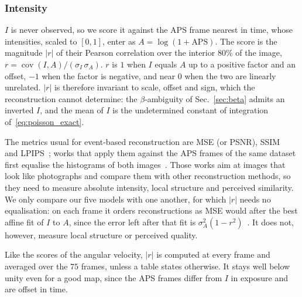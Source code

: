 \documentclass[journal]{IEEEtran}
\newcommand{\Imap}{I}
\begin{document}
\subsubsection{Intensity}
\label{sec:recon_metric}
$\Imap$ is never observed, so we score it against the APS frame nearest in time, whose intensities, scaled to $[0,1]$, enter as $A = \log(1+\text{APS})$. The score is the magnitude $|r|$ of their Pearson correlation over the interior $80\%$ of the image, $r = \operatorname{cov}(\Imap, A)/(\sigma_{\Imap}\,\sigma_A)$. $r$ is $1$ when $\Imap$ equals $A$ up to a positive factor and an offset, $-1$ when the factor is negative, and near $0$ when the two are linearly unrelated. $|r|$ is therefore invariant to scale, offset and sign, which the reconstruction cannot determine: the $\beta$-ambiguity of Sec.~\ref{sec:beta} admits an inverted $\Imap$, and the mean of $\Imap$ is the undetermined constant of integration of~\eqref{eq:poisson_exact}.

 
The metrics usual for event-based reconstruction are MSE (or PSNR), SSIM~\cite{wang2004ssim} and LPIPS~\cite{zhang2018lpips}; works that apply them against the APS frames of the same dataset first equalise the histograms of both images~\cite{rebecq2019e2vid,zhang2023formulating}. Those works aim at images that look like photographs and compare them with other reconstruction methods, so they need to measure absolute intensity, local structure and perceived similarity. We only compare our five models with one another, for which $|r|$ needs no equalisation: on each frame it orders reconstructions as MSE would after the best affine fit of $\Imap$ to $A$, since the error left after that fit is $\sigma_A^2(1-r^2)$~\cite{freedman2007statistics}. It does not, however, measure local structure or perceived quality.


Like the scores of the angular velocity, $|r|$ is computed at every frame and averaged over the $75$ frames, unless a table states otherwise. It stays well below unity even for a good map, since the APS frames differ from $\Imap$ in exposure and are offset in time.
\end{document}

